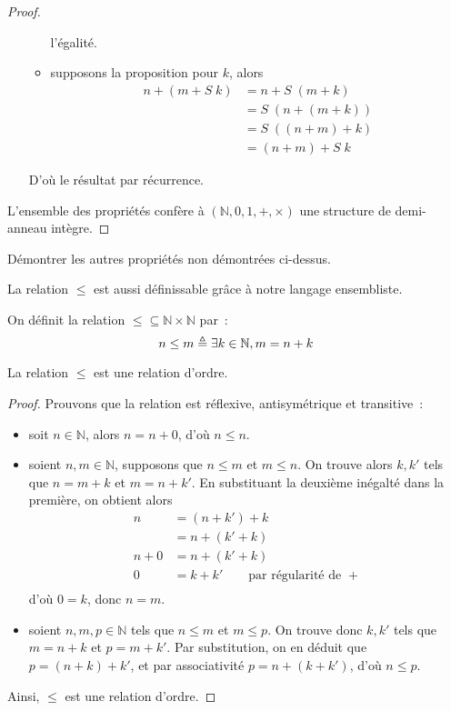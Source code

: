 \begin{proof}
\begin{itemize}
\begin{itemize}
      l'égalité.
    \item supposons la proposition pour $k$, alors
      \begin{align*}
        n+(m+S\;k) &= n + S\;(m + k)\\
        &= S\;(n+(m+k))\\
        &= S\;((n+m)+k)\\
        &= (n+m)+S\;k
      \end{align*}
    \end{itemize}
    D'où le résultat par récurrence.
  \end{itemize}
  L'ensemble des propriétés confère à $(\mathbb N,0,1,+,\times)$ une structure
  de demi-anneau intègre.
\end{proof}

\begin{exercise}
  Démontrer les autres propriétés non démontrées ci-dessus.
\end{exercise}

La relation $\leq$ est aussi définissable grâce à notre langage ensembliste.

\begin{definition}[Inégalité]
  On définit la relation $\leq\subseteq \mathbb N \times \mathbb N$ par~:
  \[n \leq m \triangleq \exists k \in \mathbb N, m = n + k\]
\end{definition}

\begin{property}
  La relation $\leq$ est une relation d'ordre.
\end{property}

\begin{proof}
  Prouvons que la relation est réflexive, antisymétrique et transitive~:
  \begin{itemize}
  \item soit $n\in \mathbb N$, alors $n = n + 0$, d'où $n\leq n$.
  \item soient $n,m\in \mathbb N$, supposons que $n \leq m$ et $m \leq n$. On
    trouve alors $k,k'$ tels que $n = m + k$ et $m = n + k'$. En substituant
    la deuxième inégalté dans la première, on obtient alors
    \begin{align*}
      n &= (n + k') + k\\
      &= n + (k' + k)\\
      n + 0 &= n + (k' + k)\\
      0 &= k + k'\qquad\text{par régularité de }+\\
    \end{align*}
    d'où $0 = k$, donc $n = m$.
  \item soient $n,m,p\in \mathbb N$ tels que $n\leq m$ et $m\leq p$. On trouve
    donc $k,k'$ tels que $m = n + k$ et $p = m + k'$. Par substitution, on en
    déduit que $p = (n + k) + k'$, et par associativité $p = n + (k + k')$, d'où
    $n \leq p$.
  \end{itemize}
  Ainsi, $\leq$ est une relation d'ordre.
\end{proof}

